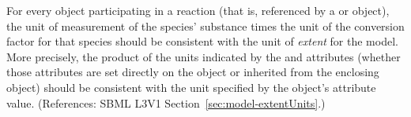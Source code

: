 For every \Species object participating in a reaction (that is, referenced
by a \SpeciesReference or \ModifierSpeciesReference object), the unit of
measurement of the species' substance times the unit of the conversion
factor for that species should be consistent with the unit of \emph{extent}
for the model.  More precisely, the product of the units indicated by the
 and  attributes (whether
those attributes are set directly on the \Species object or inherited from
the enclosing \Model object) should be consistent with the unit specified
by the \Model object's  attribute value.  (References:
SBML L3V1 Section~\ref{sec:model-extentUnits}.)

